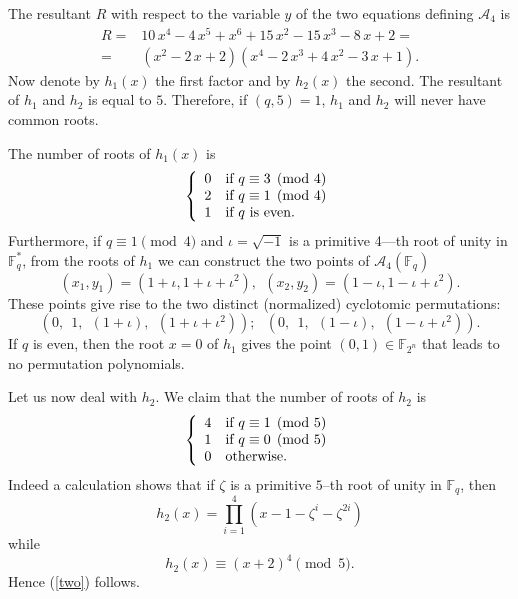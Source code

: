 \documentclass[a4paper,twoside]{article}
\begin{document}
The resultant $R$ with respect to the variable $y$ of the two
equations defining $\mathcal A_4$ is
$$\begin{array}{rl}
R= &10\,{x}^{4}-4\,{x}^{5}+{x}^{6}+15\,{x}^{2}-15\,{x}^{3}-8\,x+2=\\
= & \left ({x}^{2}-2\,x+2\right )\left
({x}^{4}-2\,{x}^{3}+4\,{x}^{2}-3\,x +1\right ).\end{array}
$$
Now denote by $h_1(x)$ the first factor and by $h_2(x)$ the second. The resultant
of $h_1$ and $h_2$ is equal to  $5$. Therefore, if $(q,5)=1$, $h_1$ and $h_2$
will never have common roots.

The number of roots of $h_1(x)$ is
\begin{equation}\label{one}
\left\{\begin{array}{rl}
$0$ & \text{if $q\equiv 3\pmod 4$}\\
$2$ & \text{if $q\equiv 1\pmod 4$}\\
$1$ & \text{if $q$ is even}.\end{array}\right.\end{equation}
Furthermore, if $q\equiv1\pmod4$ and $\iota=\sqrt{-1}$ is a
primitive 4---th root of unity in $\mathbb F_q^*$, from the roots
of $h_1$ we can construct the two points of $\mathcal A_4(\mathbb
F_q)$
\begin{equation}\label{ciclo4}
(x_1,y_1)=(1+\iota,1+\iota+\iota^2),\ \ (x_2,y_2)=(1-\iota,1-\iota+\iota^2).
\end{equation}
These points give rise to the two distinct (normalized) cyclotomic
permutations:
$$
(0,\ \ 1,\ \ (1+\iota),\ \ (1+\iota+\iota^2));\ \ \ (0,\ \ 1,\ \
(1-\iota),\ \ (1-\iota+\iota^2)).$$ If $q$ is even, then the root
$x=0$ of $h_1$ gives the point $(0,1)\in\mathbb F_{2^n}$ that
leads to no permutation polynomials.

Let us now deal with $h_2$. We claim that the number of roots of $h_2$ is
\begin{equation}\left\{\label{two}\begin{array}{rl}
$4$ & \text{if $q\equiv 1\pmod 5$}\\
$1$ & \text{if $q\equiv 0\pmod 5$}\\
$0$ & \text{otherwise.}\end{array}\right.\end{equation} Indeed a
calculation shows that if $\zeta$ is a primitive $5$--th root of
unity in $\mathbb F_q$, then
$$h_2(x)=\prod_{i=1}^4\left (x-1-\zeta^i-{\zeta}^{2i}\right )$$
while
$$h_2(x)\equiv (x+2)^4\pmod5.$$
Hence (\ref{two}) follows.
\end{document}
